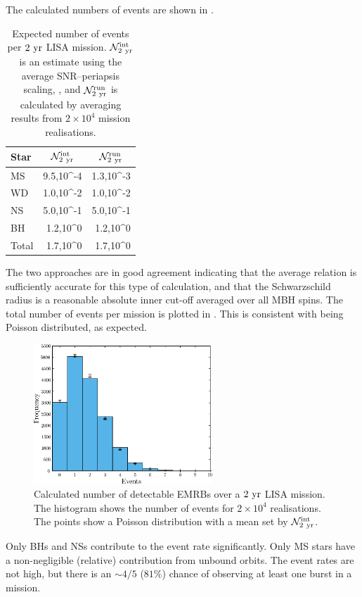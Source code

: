 The calculated numbers of events are shown in . 
\begin{table}\footnotesize
\centering
  \begin{tabular}{l D{,}{\,\times\,}{3.4} D{,}{\,\times\,}{3.4}}
  \toprule
  Star &  &  \\ \midrule
  MS & 9.5,10^{-4} & 1.3,10^{-3} \\
  WD & 1.0,10^{-2} & 1.0,10^{-2} \\
  NS & 5.0,10^{-1} & 5.0,10^{-1}  \\
  BH & 1.2,10^{0} & 1.2,10^{0} \\
  \midrule
  Total & 1.7,10^{0} & 1.7,10^{0} \\
  \bottomrule
\end{tabular}
  \caption{Expected number of events per $2~\mathrm{yr}$ LISA mission. $\mathcal{N}_{2~\mathrm{yr}}^\mathrm{int}$ is an estimate using the average SNR--periapsis scaling, , and $\mathcal{N}_{2~\mathrm{yr}}^\mathrm{run}$ is calculated by averaging results from $2 \times 10^4$ mission realisations.}\label{tab:Rates}
\end{table}
The two approaches are in good agreement indicating that the average relation  is sufficiently accurate for this type of calculation, and that the Schwarzschild radius is a reasonable absolute inner cut-off averaged over all MBH spins. The total number of events per mission is plotted in . 
This is consistent with being Poisson distributed, as expected.
\begin{figure}%
\centering
   \includegraphics[width=0.6\textwidth]{./images/Fig_Total_event_hist}
\caption{Calculated number of detectable EMRBs over a $2~\mathrm{yr}$ LISA mission. The histogram shows the number of events for $2 \times 10^4$ realisations. The points show a Poisson distribution with a mean set by $\mathcal{N}_{2~\mathrm{yr}}^\mathrm{int}$.}
\label{fig:Event-no}
\end{figure}
Only BHs and NSs contribute to the event rate significantly. Only MS stars have a non-negligible (relative) contribution from unbound orbits. The event rates are not high, but there is an $\sim 4/5$ ($81\%$) chance of observing at least one burst in a mission.

